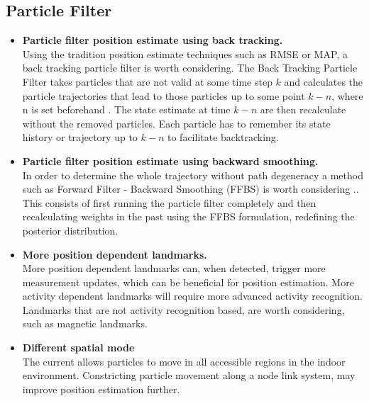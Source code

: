 \subsection{Particle Filter}

\begin{itemize}
	\item \textbf{Particle filter position estimate using back tracking.} \\
	Using the tradition position estimate techniques such as RMSE or MAP, a back tracking particle filter is worth considering. The Back Tracking Particle Filter takes particles that are not valid at some time step $ k $ and calculates the particle trajectories that lead to those particles up to some point $ k - n $, where n is set beforehand \cite{Widyawan2008}. The state estimate at time $ k-n $ are then recalculate without the removed particles. Each particle has to remember its state history or trajectory up to $ k-n $ to facilitate backtracking.
	
	\item \textbf{Particle filter position estimate using backward smoothing.}\\
	In order to determine the whole trajectory without path degeneracy a method such as Forward Filter - Backward Smoothing (FFBS) is worth considering \cite{Lindsten2013, Nurminen2013}.. This consists of first running the particle filter completely and then recalculating weights in the past using the FFBS formulation, redefining the posterior distribution.
	
	\item \textbf{More position dependent landmarks.}\\
	More position dependent landmarks can, when detected, trigger more measurement updates, which can be beneficial for position estimation. More activity dependent landmarks will require more advanced activity recognition. Landmarks that are not activity recognition based, are worth considering, such as magnetic landmarks.
	
	\item \textbf{Different spatial mode}\\
	The current allows particles to move in all accessible regions in the indoor environment. Constricting particle movement along a node link system, may improve position estimation further.
\end{itemize}
